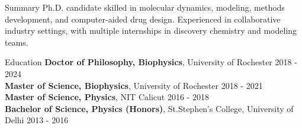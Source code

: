 \documentclass{resume} %
\begin{document}

\begin{rSection}{Summary}
   Ph.D. candidate skilled in molecular dynamics, modeling, methods development, and computer-aided drug design. Experienced in collaborative industry settings, with multiple internships in discovery chemistry and modeling teams.
\end{rSection}


\begin{rSection}{Education}
   {\bf Doctor of Philosophy, Biophysics}, University of Rochester  \hfill {2018 - 2024}\\
   {\bf Master of Science, Biophysics}, University of Rochester \hfill {2018 - 2021}\\
   {\bf Master of Science, Physics}, NIT Calicut \hfill {2016 - 2018}\\
   {\bf Bachelor of Science, Physics (Honors)}, St.Stephen's College, University of Delhi \hfill {2013 - 2016}

\end{rSection}

\end{document}
